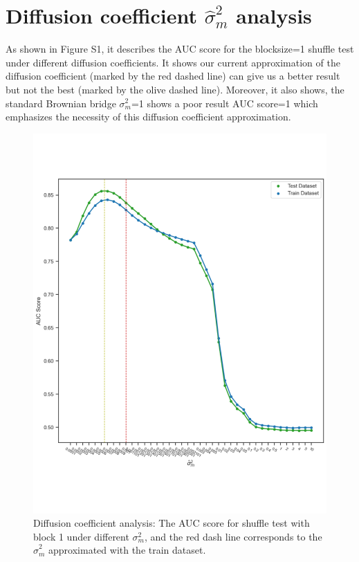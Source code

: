 \documentclass[letterpaper]{article}
\begin{document}
\section{Diffusion coefficient $\hat{\sigma}^2_m$ analysis}
\label{sec:app1_DCA}
As shown in Figure S1, it describes the AUC score for the blocksize=1 shuffle test under different diffusion coefficients. It shows our current approximation of the diffusion coefficient (marked by the red dashed line) can give us a better result but not the best (marked by the olive dashed line). Moreover, it also shows, the standard Brownian bridge $\sigma^2_m$=1 shows a poor result AUC score=1 which emphasizes the necessity of this diffusion coefficient approximation.
\begin{figure}[htbp]
\centering
\includegraphics[width=0.7\linewidth, trim={1.1cm 3cm 0cm 2cm},clip]{pictures/auc_check.pdf}
\caption{Diffusion coefficient analysis: The AUC score for shuffle test with block 1 under different $\sigma^2_m$, and the red dash line corresponds to the $\hat{\sigma}^2_m$ approximated with the train dataset.}
\label{fig:diff_coeff_analysis}
\end{figure}
\end{document}
